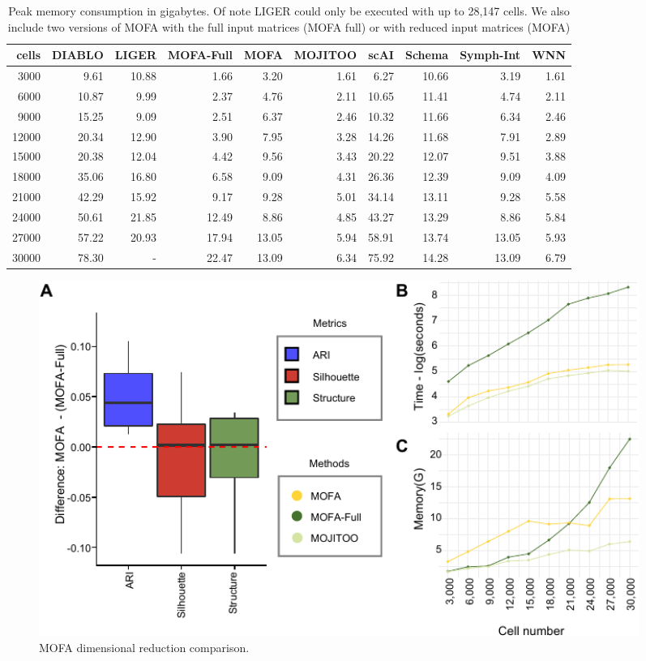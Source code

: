\begin{table}[ht]
\centering
\caption[Peak Memory of MOJITOO]{Peak memory consumption in gigabytes. Of note LIGER could only be executed with up to 28,147 cells. We also include  two versions of MOFA with the full input matrices (MOFA full) or with reduced input matrices (MOFA)}
\begin{tabular}{r|rrrrrrrrr}
  \hline
 cells & DIABLO & LIGER & MOFA-Full & MOFA & MOJITOO & scAI & Schema & Symph-Int & WNN \\ 
  \hline
3000 & 9.61 & 10.88 & 1.66 & 3.20 & 1.61 & 6.27 & 10.66 & 3.19 & 1.61 \\ 
  6000 & 10.87 & 9.99 & 2.37 & 4.76 & 2.11 & 10.65 & 11.41 & 4.74 & 2.11 \\ 
  9000 & 15.25 & 9.09 & 2.51 & 6.37 & 2.46 & 10.32 & 11.66 & 6.34 & 2.46 \\ 
  12000 & 20.34 & 12.90 & 3.90 & 7.95 & 3.28 & 14.26 & 11.68 & 7.91 & 2.89 \\ 
  15000 & 20.38 & 12.04 & 4.42 & 9.56 & 3.43 & 20.22 & 12.07 & 9.51 & 3.88 \\ 
  18000 & 35.06 & 16.80 & 6.58 & 9.09 & 4.31 & 26.36 & 12.39 & 9.09 & 4.09 \\ 
  21000 & 42.29 & 15.92 & 9.17 & 9.28 & 5.01 & 34.14 & 13.11 & 9.28 & 5.58 \\ 
  24000 & 50.61 & 21.85 & 12.49 & 8.86 & 4.85 & 43.27 & 13.29 & 8.86 & 5.84 \\ 
  27000 & 57.22 & 20.93 & 17.94 & 13.05 & 5.94 & 58.91 & 13.74 & 13.05 & 5.93 \\
  30000 & 78.30 & - & 22.47 & 13.09 & 6.34 & 75.92 & 14.28 & 13.09 & 6.79 \\ 
   \hline
\end{tabular}
\label{tab:memory}
\end{table}


\begin{figure}[!ht]
	\centering
	\includegraphics[width=0.95\textwidth]{MOFA/fig}
	\vspace{0.1cm}
	\caption[MOFA dimensional reduction comparison.]{MOFA dimensional reduction comparison.}
	\label{fig:MOFA}
\end{figure}



